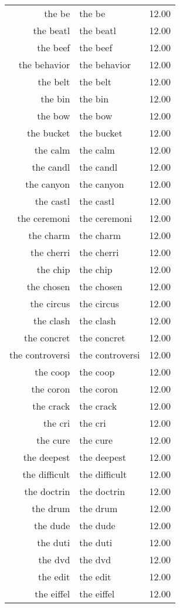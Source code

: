 \begin{table}[ht]
\begin{tabular}{rlr}
  the be & the be & 12.00 \\ 
  the beatl & the beatl & 12.00 \\ 
  the beef & the beef & 12.00 \\ 
  the behavior & the behavior & 12.00 \\ 
  the belt & the belt & 12.00 \\ 
  the bin & the bin & 12.00 \\ 
  the bow & the bow & 12.00 \\ 
  the bucket & the bucket & 12.00 \\ 
  the calm & the calm & 12.00 \\ 
  the candl & the candl & 12.00 \\ 
  the canyon & the canyon & 12.00 \\ 
  the castl & the castl & 12.00 \\ 
  the ceremoni & the ceremoni & 12.00 \\ 
  the charm & the charm & 12.00 \\ 
  the cherri & the cherri & 12.00 \\ 
  the chip & the chip & 12.00 \\ 
  the chosen & the chosen & 12.00 \\ 
  the circus & the circus & 12.00 \\ 
  the clash & the clash & 12.00 \\ 
  the concret & the concret & 12.00 \\ 
  the controversi & the controversi & 12.00 \\ 
  the coop & the coop & 12.00 \\ 
  the coron & the coron & 12.00 \\ 
  the crack & the crack & 12.00 \\ 
  the cri & the cri & 12.00 \\ 
  the cure & the cure & 12.00 \\ 
  the deepest & the deepest & 12.00 \\ 
  the difficult & the difficult & 12.00 \\ 
  the doctrin & the doctrin & 12.00 \\ 
  the drum & the drum & 12.00 \\ 
  the dude & the dude & 12.00 \\ 
  the duti & the duti & 12.00 \\ 
  the dvd & the dvd & 12.00 \\ 
  the edit & the edit & 12.00 \\ 
  the eiffel & the eiffel & 12.00 \\ 

\end{tabular}
\end{table}
